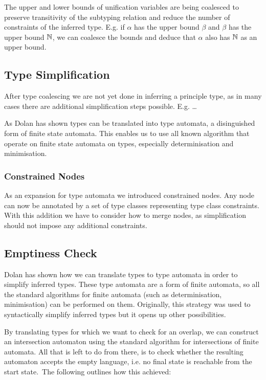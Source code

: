 The upper and lower bounds of unification variables are being coalesced to preserve transitivity of the subtyping relation and reduce the number of constraints of the inferred type.
E.g. if $\alpha$ has the upper bound $\beta$ and $\beta$ has the upper bound $\mathbb{N}$, we can coalesce the bounds and deduce that $\alpha$ also has $\mathbb{N}$ as an upper bound.

\subsection{Type Simplification}

After type coalescing we are not yet done in inferring a principle type, as in many cases there are additional simplification steps possible.
E.g. \dots

As Dolan has shown \cite{dolan2017subtyping} types can be translated into type automata, a disinguished form of finite state automata.
This enables us to use all known algorithm that operate on finite state automata on types, especially determinisation and minimisation.

\subsubsection{Constrained Nodes}

As an expansion for type automata we introduced constrained nodes.
Any node can now be annotated by a set of type classes representing type class constraints.
With this addition we have to consider how to merge nodes, as simplification should not impose any additional constraints.

\subsection{Emptiness Check}

Dolan \cite{downen2017phd} has shown how we can translate types to type automata in order to simplify inferred types.
These type automata are a form of finite automata, so all the standard algorithms for finite automata (such as determinisation, minimisation) can be performed on them.
Originally, this strategy was used to syntactically simplify inferred types but it opens up other possibilities.

By translating types for which we want to check for an overlap, we can construct an intersection automaton using the standard algorithm for intersections of finite automata.
All that is left to do from there, is to check whether the resulting automaton accepts the empty language,  i.e. no final state is reachable from the start state.\
The following outlines how this achieved:

